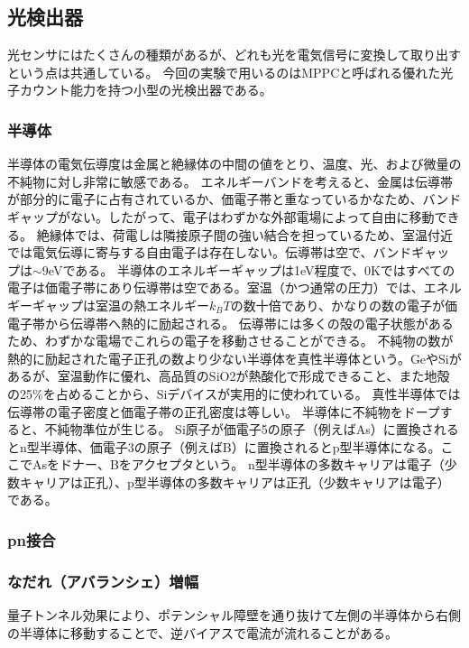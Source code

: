 \subsection{光検出器}
光センサにはたくさんの種類があるが、どれも光を電気信号に変換して取り出すという点は共通している。
今回の実験で用いるのはMPPCと呼ばれる優れた光子カウント能力を持つ小型の光検出器である。

\subsubsection{半導体}
半導体の電気伝導度は金属と絶縁体の中間の値をとり、温度、光、および微量の不純物に対し非常に敏感である。
エネルギーバンドを考えると、金属は伝導帯が部分的に電子に占有されているか、価電子帯と重なっているかなため、バンドギャップがない。したがって、電子はわずかな外部電場によって自由に移動できる。
絶縁体では、荷電しは隣接原子間の強い結合を担っているため、室温付近では電気伝導に寄与する自由電子は存在しない。伝導帯は空で、バンドギャップは$\sim9$eVである。
半導体のエネルギーギャップは1eV程度で、0Kではすべての電子は価電子帯にあり伝導帯は空である。室温（かつ通常の圧力）では、エネルギーギャップは室温の熱エネルギー$k_BT$の数十倍であり、かなりの数の電子が価電子帯から伝導帯へ熱的に励起される。
伝導帯には多くの殻の電子状態があるため、わずかな電場でこれらの電子を移動させることができる。
不純物の数が熱的に励起された電子正孔の数より少ない半導体を真性半導体という。GeやSiがあるが、室温動作に優れ、高品質のSiO2が熱酸化で形成できること、また地殻の25\%を占めることから、Siデバイスが実用的に使われている。
真性半導体では伝導帯の電子密度と価電子帯の正孔密度は等しい。
半導体に不純物をドープすると、不純物準位が生じる。
Si原子が価電子5の原子（例えばAs）に置換されるとn型半導体、価電子3の原子（例えばB）に置換されるとp型半導体になる。ここでAsをドナー、Bをアクセプタという。
n型半導体の多数キャリアは電子（少数キャリアは正孔）、p型半導体の多数キャリアは正孔（少数キャリアは電子）である。

\subsubsection{pn接合}


\subsubsection{なだれ（アバランシェ）増幅}
量子トンネル効果により、ポテンシャル障壁を通り抜けて左側の半導体から右側の半導体に移動することで、逆バイアスで電流が流れることがある。

